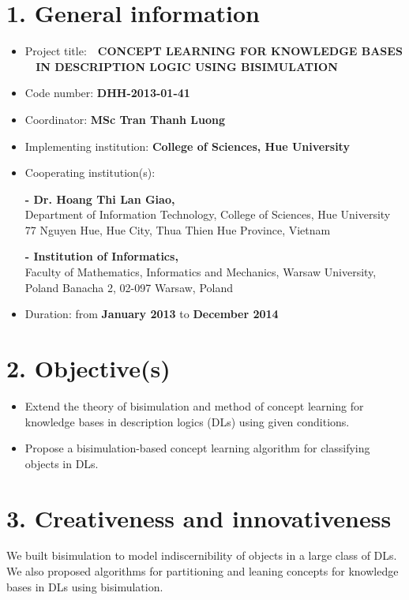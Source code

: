 \section*{1. General information}
\begin{itemize}
	\item Project title:~~\textbf{CONCEPT LEARNING FOR KNOWLEDGE BASES\\ \mbox{~}\hspace{12.5ex} IN DESCRIPTION LOGIC USING BISIMULATION}\\[-0.8cm]
	\item Code number: {\bf DHH-2013-01-41}\\[-0.8cm]
	\item Coordinator: {\bf MSc Tran Thanh Luong}\\[-0.8cm]
	\item Implementing institution: {\bf College of Sciences, Hue University}\\[-0.8cm]
	\item Cooperating institution(s):
	
	{\bf - Dr. Hoang Thi Lan Giao,}\\
	Department of Information Technology, College of Sciences, Hue University\\
	77 Nguyen Hue, Hue City, Thua Thien Hue Province, Vietnam
	
	{\bf - Institution of Informatics,}\\
	Faculty of Mathematics, Informatics and Mechanics, Warsaw University, Poland
	Banacha 2, 02-097 Warsaw, Poland\\[-0.8cm]
	\item Duration: from {\bf January 2013} to {\bf December 2014}
\end{itemize}
\section*{2. Objective(s)}	
\begin{itemize}
	\item Extend the theory of bisimulation and method of concept learning for knowledge bases in description logics (DLs) using given conditions. 

	\item Propose a bisimulation-based concept learning algorithm for classifying objects in DLs.
\end{itemize}
\section*{3. Creativeness and innovativeness}
We built bisimulation to model indiscernibility of objects in a large class of DLs. We also proposed algorithms for partitioning and leaning concepts for knowledge bases in DLs using bisimulation.
